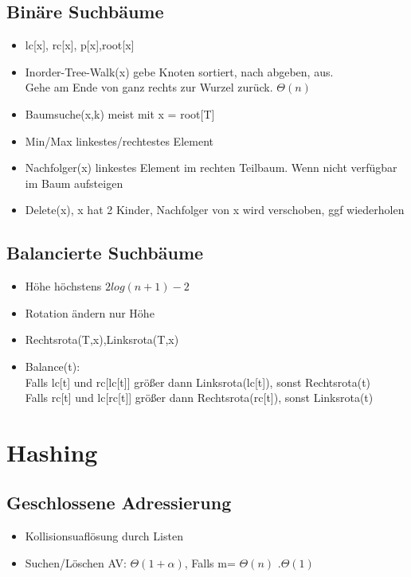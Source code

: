 \documentclass{article}
\begin{document}
\subsection{Binäre Suchbäume}
\begin{itemize}
\item lc[x], rc[x], p[x],root[x]
\item Inorder-Tree-Walk(x) gebe Knoten sortiert, nach abgeben, aus. \\ Gehe am Ende von ganz rechts zur Wurzel zurück. $\Theta(n)$
\item Baumsuche(x,k) meist mit x = root[T]
\item Min/Max linkestes/rechtestes Element
\item Nachfolger(x) linkestes Element im rechten Teilbaum. Wenn nicht verfügbar im Baum aufsteigen
\item Delete(x), x hat 2 Kinder, Nachfolger von x wird verschoben, ggf wiederholen
\end{itemize}

\subsection{Balancierte Suchbäume}
\begin{itemize}
\item Höhe höchstens $2log(n+1)-2$
\item Rotation ändern nur Höhe
\item Rechtsrota(T,x),Linksrota(T,x)
\item Balance(t): \\Falls lc[t] und rc[lc[t]] größer dann Linksrota(lc[t]), sonst Rechtsrota(t) \\
	Falls rc[t] und lc[rc[t]] größer dann Rechtsrota(rc[t]), sonst Linksrota(t)
\end{itemize}

\section{Hashing}
\subsection{Geschlossene Adressierung}
\begin{itemize}
\item Kollisionsuaflösung durch Listen
\item Suchen/Löschen AV: $\Theta(1+\alpha)$, Falls  m= $\Theta(n)$ $.\Theta(1)$
\end{itemize}
\end{document}
